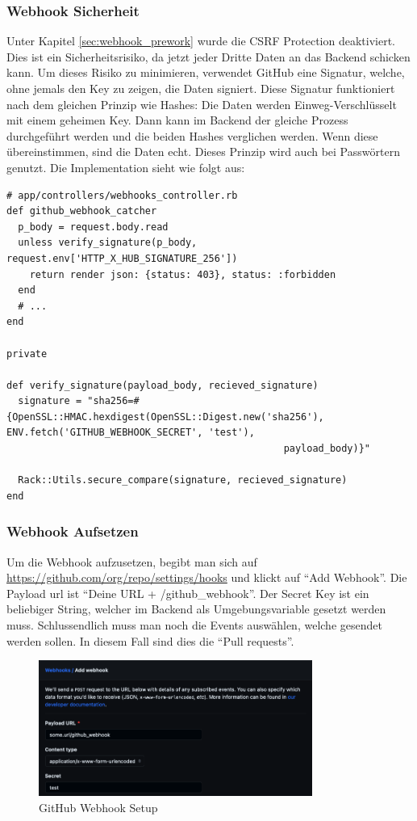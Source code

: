 \subsubsection{Webhook Sicherheit}
Unter Kapitel \ref{sec:webhook_prework} wurde die CSRF Protection deaktiviert. Dies ist ein Sicherheitsrisiko, da
jetzt jeder Dritte Daten an das Backend schicken kann. Um dieses Risiko zu minimieren, verwendet GitHub eine Signatur,
welche, ohne jemals den Key zu zeigen, die Daten signiert. Diese Signatur funktioniert nach dem gleichen Prinzip wie
Hashes: Die Daten werden Einweg-Verschlüsselt mit einem geheimen Key. Dann kann im Backend der gleiche Prozess 
durchgeführt werden und die beiden Hashes verglichen werden. Wenn diese übereinstimmen, sind die Daten echt. Dieses
Prinzip wird auch bei Passwörtern genutzt. \cite{password_storage} \newline
Die Implementation sieht wie folgt aus:
\begin{codebox}[]
  \begin{verbatim}
# app/controllers/webhooks_controller.rb
def github_webhook_catcher
  p_body = request.body.read
  unless verify_signature(p_body, request.env['HTTP_X_HUB_SIGNATURE_256'])
    return render json: {status: 403}, status: :forbidden
  end
  # ...
end

private

def verify_signature(payload_body, recieved_signature)
  signature = "sha256=#{OpenSSL::HMAC.hexdigest(OpenSSL::Digest.new('sha256'), ENV.fetch('GITHUB_WEBHOOK_SECRET', 'test'),
                                                payload_body)}"

  Rack::Utils.secure_compare(signature, recieved_signature)
end
  \end{verbatim}
\end{codebox}

\subsubsection{Webhook Aufsetzen}
Um die Webhook aufzusetzen, begibt man sich auf \url{https://github.com/org/repo/settings/hooks} und klickt auf
\enquote{Add Webhook}. Die Payload url ist \enquote{Deine URL + /github\_webhook}. Der Secret Key ist ein beliebiger
String, welcher im Backend als Umgebungsvariable gesetzt werden muss. Schlussendlich muss man noch die Events
auswählen, welche gesendet werden sollen. In diesem Fall sind dies die \enquote{Pull requests}.
\begin{figure}[H]
  \centering
  \includegraphics[width=0.8\textwidth]{images/misc/setup_webhook.png}
  \caption[Screenshot vom GitHub Webhook Setup]{GitHub Webhook Setup}
  \label{fig:github_webhook}
\end{figure}

